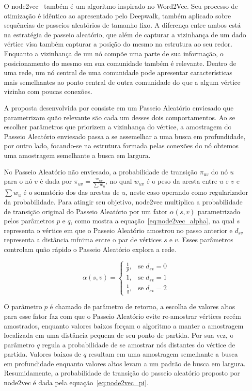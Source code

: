 O node2vec~\cite{grover16} também é um algoritmo inspirado no Word2Vec.
Seu processo de otimização é idêntico ao apresentado pelo Deepwalk, também
aplicado sobre sequências de passeios aleatórios de tamanho fixo.
A diferença entre ambos está na estratégia de passeio aleatório, que além de
capturar a vizinhança de um dado vértice visa também capturar a posição do mesmo
na estrutura ao seu redor.
Enquanto a vizinhança de um nó compõe uma parte de sua informação, o
posicionamento do mesmo em sua comunidade também é relevante.
Dentro de uma rede, um nó central de uma comunidade pode apresentar
características mais semelhantes ao ponto central de outra comunidade
do que a algum vértice vizinho com poucas conexões.

A proposta desenvolvida por \citet{grover16} consiste em um Passeio Aleatório
enviesado que parametrizam quão relevante são cada um desses dois comportamentos.
Ao se escolher parâmetros que priorizem a vizinhança do vértice, a amostragem do
Passeio Aleatório enviesado passa a se assemelhar a uma busca em profundidade,
por outro lado, focando-se na estrutura formada pelas conexões do nó obtemos uma
amostragem semelhante a busca em largura.

No Passeio Aleatório não enviesado, a probabilidade de transição $\pi_{uv}$ do
nó $u$ para o nó $v$ é dada por $\pi_{uv} = \frac{w_{uv}}{\sum{w_u}}$, no qual
$w_{uv}$ é o peso da aresta entre $u$ e $v$ e $\sum{w_u}$ é o somatório dos das
arestas de $u$, neste caso operando como regularizador da probabilidade.
Para atingir seu objetivo, node2vec multiplica a probabilidade de transição
original do Passeio Aleatório por um fator $\alpha(s, v)$ parametrizado pelos
parâmetros $p$ e $q$, como mostra a equação~\ref{eq:node2vec_alpha}, na qual
$s$ representa o vértice em que o Passeio Aleatório amostrou no passo anterior e
$d_{sv}$ representa a distância mínima entre o par de vértices $s$ e $v$.
Esses parâmetros controlam quão rápido o Passeio Aleatório explora a rede.

\begin{equation} \label{eq:node2vec_alpha}
    \alpha(s, v) =
    \begin{cases}
        \frac{1}{p} ,& \text{se } d_{sv} = 0\\
        1           ,& \text{se } d_{sv} = 1\\
        \frac{1}{q} ,& \text{se } d_{sv} = 2
    \end{cases}
\end{equation}

O parâmetro $p$ é chamado de parâmetro de retorno, a escolha de valores altos
para esse fator faz com que o Passeio Aleatório evite re-amostrar vértices
recém amostrados, enquanto valores baixos forçam o algoritmo a manter a
amostragem localizada em uma distância pequena de seu ponto de partida.
Por sua vez, o parâmetro $q$ regula a probabilidade de se amostrar nós distantes
do vértice de partida.
Valores baixos de $q$ resultam em uma amostragem semelhante a busca em
profundidade enquanto valores altos levam a um padrão de busca em largura.
Resumidamente, a probabilidade de transição do passeio aleatório proposto por
node2vec é dada pela equação~\ref{eq:node2vec_pi}.


